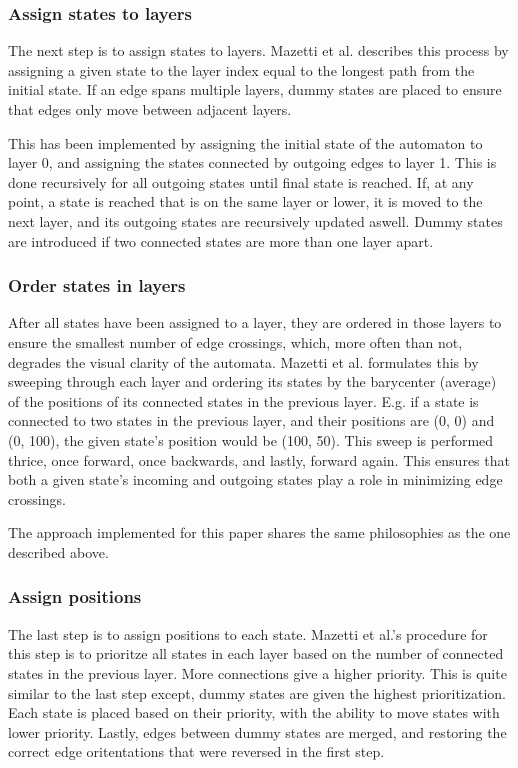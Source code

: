 

\subsubsection{Assign states to layers}
The next step is to assign states to layers. Mazetti et al. describes this process by assigning a given state to the layer index equal to the longest path from the initial state. If an edge spans multiple layers, dummy states are placed to ensure that edges only move between adjacent layers. \cite{Mazetti2012}

This has been implemented by assigning the initial state of the automaton to layer 0, and assigning the states connected by outgoing edges to layer 1.
This is done recursively for all outgoing states until final state is reached.
If, at any point, a state is reached that is on the same layer or lower, it is moved to the next layer, and its outgoing states are recursively updated aswell.
Dummy states are introduced if two connected states are more than one layer apart.



\subsubsection{Order states in layers}
After all states have been assigned to a layer, they are ordered in those layers to ensure the smallest number of edge crossings, which, more often than not, degrades the visual clarity of the automata.
Mazetti et al. formulates this by sweeping through each layer and ordering its states by the barycenter (average) of the positions of its connected states in the previous layer.
E.g. if a state is connected to two states in the previous layer, and their positions are (0, 0) and (0, 100), the given state's position would be (100, 50).
This sweep is performed thrice, once forward, once backwards, and lastly, forward again.
This ensures that both a given state's incoming and outgoing states play a role in minimizing edge crossings. \cite{Mazetti2012}

The approach implemented for this paper shares the same philosophies as the one described above.



\subsubsection{Assign positions}
The last step is to assign positions to each state.
Mazetti et al.'s procedure for this step is to prioritze all states in each layer based on the number of connected states in the previous layer.
More connections give a higher priority. This is quite similar to the last step except, dummy states are given the highest prioritization.
Each state is placed based on their priority, with the ability to move states with lower priority.
Lastly, edges between dummy states are merged, and restoring the correct edge oritentations that were reversed in the first step. \cite{Mazetti2012}

